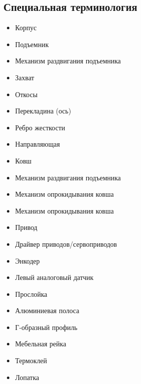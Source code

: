 \subsection{Специальная терминология}

\begin{itemize}
	\item Корпус
	\item Подъемник
	\item Механизм раздвигания подъемника
	\item Захват
	\item Откосы
	\item Перекладина (ось)
	\item Ребро жесткости
	\item Направляющая
	\item Ковш
	\item Механизм раздвигания подъемника
	\item Механизм опрокидывания ковша
	\item Механизм опрокидывания ковша
	\item Привод
	\item Драйвер приводов/сервоприводов
	\item Энкодер
	\item Левый аналоговый датчик
	\item Прослойка
	\item Алюминиевая полоса
	\item Г-образный профиль
	\item Мебельная рейка
	\item Термоклей
	\item Лопатка
\end{itemize}

\fillpage 
\newpage

